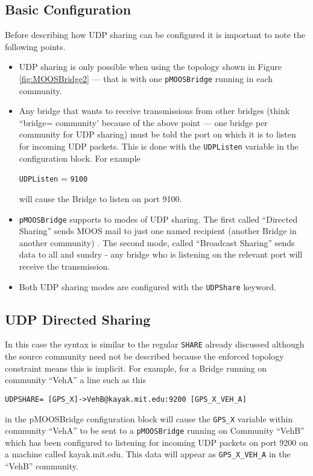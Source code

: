 \documentclass[a4paper,10pt]{article}
\newcommand{\Code}[1]{\texttt{#1} }
\newcommand{\code}[1]{\Code{#1} }
\begin{document}
\subsection{Basic Configuration}
Before describing how UDP sharing can be configured it is important to note the following points.
\begin{itemize}
\item  UDP sharing is only possible when using the topology shown in Figure \ref{fig:MOOSBridge2} --- that is with one \code{pMOOSBridge} running in each community.
\item Any bridge that wants to receive transmissions from other bridges (think ``bridge= community' because of the above point --- one bridge per community for UDP sharing) must be told the port on which it is to listen for incoming UDP packets. This is done with the \code{UDPListen} variable in the configuration block.  For example 
\begin{center}
\code{UDPListen} = \code{9100}
\end{center}
will cause the Bridge to listen on port 9100.
\item \code{pMOOSBridge} supports to modes of UDP sharing. The first called ``Directed Sharing'' sends MOOS mail to just one named recipient (another Bridge in another community) . The second mode, called ``Broadcast Sharing''  sends data to all and sundry  - any bridge who is listening on the relevant port will receive the transmission.
\item Both UDP sharing modes are configured with the \code{UDPShare} keyword.
 \end{itemize}
 
 
\subsection{UDP Directed Sharing}

In this case the syntax is similar to the regular \code{SHARE} already discussed although the source community need not be described because the enforced topology constraint means this is implicit. For example, for  a Bridge running on community ``VehA'' a line such as this
\begin{verbatim}
UDPSHARE= [GPS_X]->VehB@kayak.mit.edu:9200 [GPS_X_VEH_A]
\end{verbatim}

in the pMOOSBridge configuration block will cause the \code{GPS\_X} variable within community ``VehA'' to be sent to a \code{pMOOSBridge} running on Community ``VehB'' which has been configured to listening for incoming UDP packets on port 9200 on a machine called kayak.mit.edu. This data will appear as \code{GPS\_X\_VEH\_A} in the ``VehB'' community.
\end{document}

